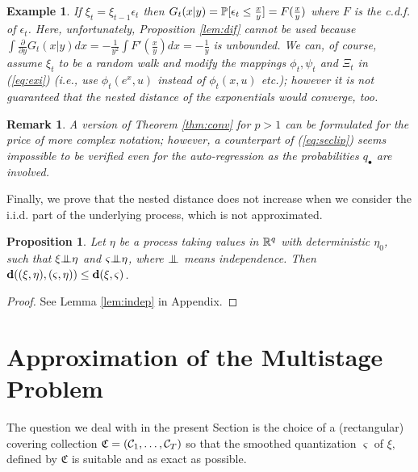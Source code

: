 \documentclass{article}              %
\newtheorem{example}{Example}
\newtheorem{proposition}{Proposition}
\newtheorem{remark}{Remark}
\begin{document}
\begin{example}
If $\xi_{t}=\xi_{t-1}\epsilon_{t}$ then $G_{t}(x|y)=\P[\epsilon_{t}\leq\frac{x}{y}]=F(\frac{x}{y})$
where $F$ is the c.d.f. of $\epsilon_{t}$. Here, unfortunately,
Proposition \ref{lem:dif} cannot be used because $\int\frac{\partial}{\partial y}G_{t}(x|y)dx=-\frac{1}{y^{2}}\int F'(\frac{x}{y})dx=-\frac{1}{y}$
is unbounded. We can, of course, assume $\xi_{t}$ to be a random walk
and modify the mappings $\phi_{t},\psi_{t}$ and $\Xi_{t}$ in (\ref{eq:exi})
(i.e., use $\phi_{t}(e^{x},u)$ instead of $\phi_{t}(x,u)$ etc.);
however it is not guaranteed that the nested distance of the exponentials
would converge, too. 
\end{example}

\begin{remark}
A version of Theorem \ref{thm:conv} for $p>1$ can be formulated
for the price of more complex notation; however, a counterpart of (\ref{eq:seclip}) seems impossible to be verified even
for the auto-regression as the probabilities $q_{\bullet}$ are involved. 
\end{remark}

\noindent Finally, we prove that the nested distance does not increase when
we consider the i.i.d. part of the underlying process, which is not approximated.
\begin{proposition}
\label{prop:witheta}Let $\eta$ be a process taking values in $\R^{q}$
with deterministic $\eta_{0}$, such that $\xi\indep{\eta}$ and $\varsigma\indep{\eta}$, where $\indep$ means independence.
Then $\d((\xi,\eta),(\varsigma,\eta))\le\d(\xi,\varsigma)$.
\end{proposition}

\begin{proof}
See Lemma \ref{lem:indep} in Appendix. 
\end{proof}


\section{\label{sec:approx}Approximation of the Multistage Problem}

The question we deal
with in the present Section is the choice of a (rectangular) covering
collection $\mathfrak{C}=(\C_{1},\dots,\C_{T})$ so that the smoothed
quantization $\varsigma$ of $\xi,$ defined by $\mathfrak{C}$ is
suitable and as exact as possible.
\end{document}
